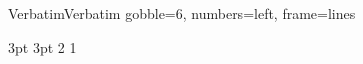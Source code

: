 \usepackage{fancyvrb}
\RecustomVerbatimEnvironment
{Verbatim}{Verbatim}
{gobble=6, numbers=left, frame=lines}
\usepackage[shortlabels]{enumitem}
\usepackage{amsmath}
\usepackage{amsthm}
\usepackage{metalogo}
\usepackage{dirtree}
\usepackage[a4paper,left=2.5cm,right=2.5cm,top=2.5cm,bottom=2cm]{geometry} %
{3pt}%
{3pt}%
{}%
{2\ccwd}%
{\bfseries}%
{}%
{1\ccwd}%
{}%
\theoremstyle{normal}
\newtheorem{Remark}{注}[section]
\renewcommand{\emph}[1]{\textbf{#1}}
